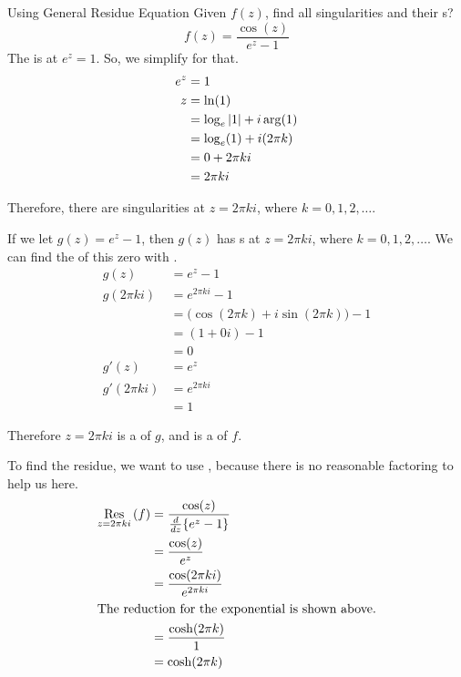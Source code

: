 \begin{example}{Using General Residue Equation}
  Given $f(z)$, find all singularities and their s?
  \begin{equation*}
    f(z) = \frac{\cos(z)}{e^{z} - 1}
  \end{equation*}
  \tcblower{}
  The  is at $e^{z} = 1$.
  So, we simplify for that.
  \begin{align*}
    e^{z} &= 1 \\
    z &= \ln(1) \\
          &= \log_{e} \Modulus{1} + i \arg(1) \\
          &= \log_{e}(1) + i (2 \pi k) \\
          &= 0 + 2\pi ki \\
          &= 2\pi ki
  \end{align*}

  Therefore, there are singularities at $z = 2\pi k i$, where $k = 0, 1, 2, \ldots$.

  If we let $g(z) = e^{z} - 1$, then $g(z)$ has s at $z = 2\pi k i$, where $k = 0, 1, 2, \ldots$.
  We can find the  of this zero with .
  \begin{align*}
    g(z) &= e^{z} - 1 \\
    g(2\pi k i) &= e^{2\pi k i} - 1 \\
         &= \bigl( \cos(2\pi k) + i \sin(2\pi k) \bigr) - 1\\
         &= (1 + 0i) - 1\\
         &= 0 \\
    g'(z) &= e^{z} \\
    g'(2\pi k i) &= e^{2\pi k i} \\
         &= 1
  \end{align*}

  Therefore $z = 2\pi k i$ is a  of $g$, and is a  of $f$.

  To find the residue, we want to use , because there is no reasonable factoring to help us here.
  \begin{align*}
    \Residue{f}{z = 2\pi k i} &= \frac{\cos(z)}{\frac{d}{dz} \lbrace e^{z}-1 \rbrace} \\
                              &= \frac{\cos(z)}{e^{z}} \\
                              &= \frac{\cos(2\pi k i)}{e^{2\pi k i}} \\
    \shortintertext{The reduction for the exponential is shown above.}
                              &= \frac{\cosh(2\pi k)}{1} \\
                              &= \cosh(2\pi k)
  \end{align*}
\end{example}

